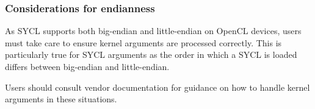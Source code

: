 \subsubsection{Considerations for endianness}

As SYCL supports both big-endian and little-endian on OpenCL devices, users must
take care to ensure kernel arguments are processed correctly. This is
particularly true for SYCL  arguments as the order in which a
SYCL  is loaded differs between big-endian and little-endian.

Users should consult vendor documentation for guidance on how to handle kernel
arguments in these situations.


